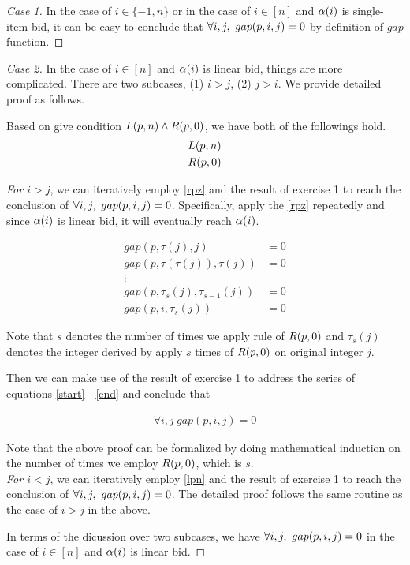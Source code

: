 \documentclass[11pt,a4paper]{article}
\begin{document}
\begin{proof}[Case 1]
In the case of $i \in \{-1, n\}$ or in the case of $i \in [n]$ and $\alpha(i)$ is
single-item bid, it can be easy to conclude that $\forall i,j,\ gap(p,i,j) = 0$ by definition of
$gap$ function.

\end{proof}

\begin{proof}[Case 2]
In the case of $i \in [n]$ and $\alpha(i)$ is linear bid, things are more
complicated. There are two subcases, (1) $i > j$, (2) $j > i$. We provide
detailed proof as follows.

Based on give condition $L(p,n) \wedge R(p,0)$, we have both of the followings
hold.
\begin{align}
    L(p,n) \label{lpn} \\   
    R(p,0) \label{rpz}
\end{align}

\noindent
{\it For $i > j$}, we can iteratively employ \eqref{rpz} and the result of exercise
1 to reach the conclusion of $\forall i,j,\ gap(p,i,j) = 0$.
Specifically, apply the \eqref{rpz} repeatedly and since $\alpha(i)$ is linear
bid, it will eventually reach $\alpha(i)$. 

\begin{align}
    gap(p,\tau(j), j) &= 0 \label{start} \\
    gap(p,\tau(\tau(j)), \tau(j)) &= 0 \\
    \vdots& \nonumber \\
    gap(p,\tau_s(j),\tau_{s-1}(j)) &= 0 \\
    gap(p,i,\tau_s(j)) &= 0 \label{end}
\end{align}

Note that $s$ denotes the number of times we apply rule of $R(p,0)$ and
$\tau_{s}(j)$ denotes the integer derived by apply $s$ times of $R(p,0)$ on
original integer $j$. 

Then we can make use of the result of exercise 1 to address the series of
equations \eqref{start} - \eqref{end} and conclude that 

\begin{align}
    \forall i,j\ gap(p, i, j) = 0
\end{align}

Note that the above proof can be formalized by doing mathematical induction on
the number of times we employ $R(p,0)$, which is $s$. \\[0.3cm]

\noindent
{\it For $i < j$}, we can iteratively employ \eqref{lpn} and the result of exercise
1 to reach the conclusion of $\forall i,j,\ gap(p,i,j) = 0$. The detailed proof
follows the same routine as the case of $i > j$ in the above. 

In terms of the dicussion over two subcases, we have $\forall i,j,\ gap(p,i,j) =
0$ in the case of $i \in [n]$ and $\alpha(i)$ is linear bid.

\end{proof}
\end{document}
